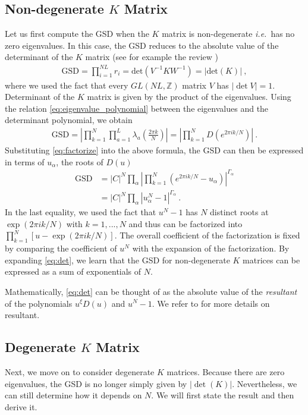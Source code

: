 \documentclass[aps,prb,twocolumn,superscriptaddress,floatfix,10pt,nofootinbib]{revtex4-2}
\newcommand{\ie}{\begin{equation}\begin{aligned}}
\newcommand{\fe}{\end{aligned}\end{equation}}
\theoremstyle{definition}
\begin{document}
\subsection{Non-degenerate $K$ Matrix}
Let us first compute the GSD when the $K$ matrix is non-degenerate \textit{i.e.}\ has no zero eigenvalues. In this case, the GSD reduces to the absolute value of the determinant of the $K$ matrix (see for example the review \cite{Wen:1995qn})
\ie
\text{GSD}=\prod_{i=1}^{NL}r_i=\text{det}(V^{-1}KW^{-1})=|\text{det}(K)|~,
\fe
where we used the fact that every $GL(NL,\mathbb{Z})$ matrix $V$ has $|\det V|=1$. Determinant of the $K$ matrix is given by the product of the eigenvalues. Using the relation \eqref{eq:eigenvalue_polynomial} between the eigenvalues and the determinant polynomial, we obtain
\ie
\text{GSD}=\left|\prod_{k=1}^N\prod_{a=1}^L\lambda_a\left(\frac{2\pi k}{N}\right)\right|=\left|\prod_{k=1}^N D(e^{{2\pi ik}/{N}})\right|~.
\fe
Substituting \eqref{eq:factorize} into the above formula, the GSD can then be expressed in terms of $u_\alpha$, the roots of $D(u)$
\ie\label{eq:det}
\text{GSD}
&=|C|^N\prod_\alpha\left|\prod_{k=1}^N(e^{{2\pi ik}/{N}}-u_\alpha)\right|^{\Gamma_\alpha}
\\
&=|C|^N\prod_\alpha\left|u_\alpha^N-1\right|^{\Gamma_\alpha}~.
\fe
In the last equality, we used the fact that $u^N-1$ has $N$ distinct roots at $\exp(2\pi ik/N)$ with $k=1,...,N$ and thus can be factorized into $\prod_{k=1}^N[u-\exp(2\pi ik/N)]$. The overall coefficient of the factorization is fixed by comparing the coefficient of $u^N$ with the expansion of the factorization. By expanding \eqref{eq:det}, we learn that the GSD for non-degenerate $K$ matrices can be expressed as a sum of exponentials of $N$. 

Mathematically, \eqref{eq:det} can be thought of as the absolute value of the \textit{resultant} of the polynomials $u^\xi D(u)$ and $u^N-1$. We refer to \cite{cohn2000classic} for more details on resultant.



\subsection{Degenerate $K$ Matrix}

Next, we move on to consider degenerate $K$ matrices. Because there are zero eigenvalues, the GSD is no longer simply given by $|\det(K)|$. Nevertheless, we can still determine how it depends on $N$. We will first state the result and then derive it.
\end{document}

